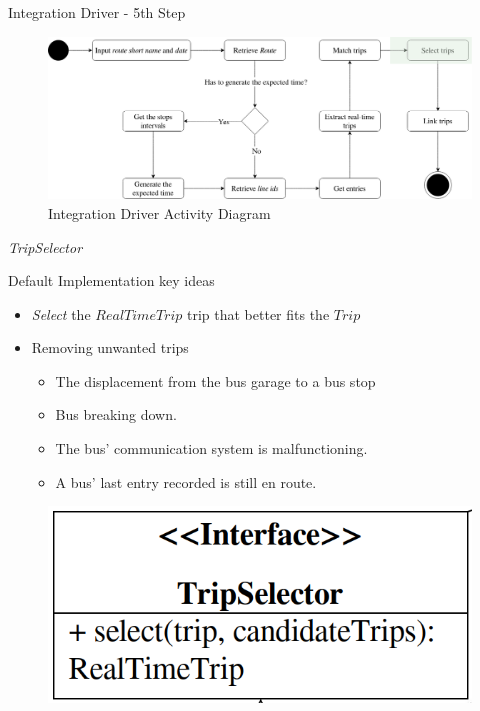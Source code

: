 \documentclass[xcolor=dvipsnames,table]{beamer}
\begin{document}
\begin{frame}{Integration Driver - 5th Step}
        \begin{figure}[H]
                \centering
                \includegraphics[width = \textwidth]{images/integrationDriverAD(5th_step).png}
                \caption{Integration Driver Activity Diagram}
        \end{figure}
\end{frame}
\begin{frame}{\textit{TripSelector}}
        \begin{block}{Default Implementation key ideas}
                \begin{itemize}
                        \item {\em Select} the $RealTimeTrip$ trip that better fits the $Trip$
                        \item Removing unwanted trips
                                \begin{itemize}
                                        \item The displacement from the bus 
                                                garage to a bus stop
                                        \item Bus breaking down.
                                        \item The bus' communication system is malfunctioning.
                                        \item A bus' last entry recorded is still en route.
                                \end{itemize}
                \end{itemize}
        \end{block}
        \begin{figure}[H]
                \centering
                \includegraphics[scale=0.25]{images/TripSelector.png}
        \end{figure}
\end{frame}
\end{document}
